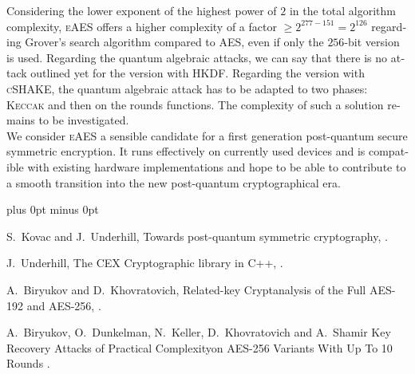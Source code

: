 \documentclass[a4paper,11pt]{article}
\begin{document}
\begin{otherlanguage}{english}
\begin{multicols}{2}
\vspace{0.1cm}

\noindent
Considering the lower exponent of the highest power of $2$ in the total algorithm complexity, \textsc{eAES} offers a higher complexity of a factor $\geq 2^{277-151}=2^{126}$ regarding Grover's search algorithm compared to  \textsc{AES}, even if only the $256$-bit version is used. Regarding the quantum algebraic attacks, we can say that there is no attack outlined yet for the version with \textsc{HKDF}. Regarding the version with \textsc{cSHAKE}, the quantum algebraic attack has to be adapted to two phases: \textsc{Keccak} and then on the rounds functions. The complexity of such a solution remains to be investigated.\\

\noindent
We consider \textsc{eAES} a sensible candidate for a first generation post-quantum secure symmetric encryption. It runs effectively on currently used devices and is compatible with existing hardware implementations and hope to be able to contribute to a smooth transition into the new post-quantum cryptographical era.


\vspace{2cm}



\begin{thebibliography}{1}
\itemsep=0cm plus 0pt minus 0pt

S.~Kovac and J.~Underhill,
\newblock Towards post-quantum symmetric cryptography,
.

J.~Underhill,
\newblock The CEX Cryptographic library in C++,
.

A.~Biryukov and D.~Khovratovich,
\newblock Related-key Cryptanalysis of the Full AES-192 and AES-256,
.

A.~Biryukov, O.~Dunkelman, N.~Keller, D.~Khovratovich and A.~Shamir
\newblock Key Recovery Attacks of Practical Complexityon AES-256 Variants With Up To 10 Rounds
.


\end{thebibliography}
\end{multicols}
\end{otherlanguage}
\end{document}
